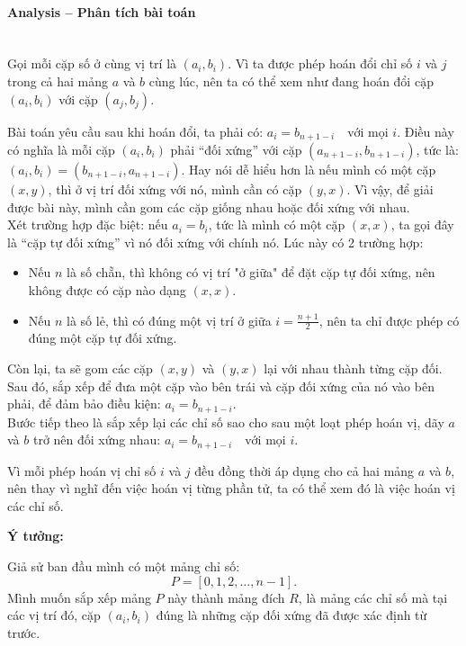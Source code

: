 \documentclass{article}
\begin{document}
\paragraph{Analysis -- Phân tích bài toán} \mbox{} \\

Gọi mỗi cặp số ở cùng vị trí là $(a_i, b_i)$. Vì ta được phép hoán đổi chỉ số $i$ và $j$ trong cả hai mảng $a$ và $b$ cùng lúc, nên ta có thể xem như đang hoán đổi cặp $(a_i, b_i)$ với cặp $(a_j, b_j)$.

Bài toán yêu cầu sau khi hoán đổi, ta phải có: $a_i = b_{n+1-i} \quad \text{với mọi } i.$
Điều này có nghĩa là mỗi cặp $(a_i, b_i)$ phải ``đối xứng'' với cặp $(a_{n+1-i}, b_{n+1-i})$, tức là: $(a_i, b_i) = (b_{n+1-i}, a_{n+1-i}).$
Hay nói dễ hiểu hơn là nếu mình có một cặp $(x, y)$, thì ở vị trí đối xứng với nó, mình cần có cặp $(y, x)$. Vì vậy, để giải được bài này, mình cần gom các cặp giống nhau hoặc đối xứng với nhau.\\

Xét trường hợp đặc biệt: nếu $a_i = b_i$, tức là mình có một cặp $(x, x)$, ta gọi đây là ``cặp tự đối xứng'' vì nó đối xứng với chính nó. Lúc này có 2 trường hợp:

\begin{itemize}
    \item Nếu $n$ là số chẵn, thì không có vị trí "ở giữa" để đặt cặp tự đối xứng, nên không được có cặp nào dạng $(x,x)$.
    \item Nếu $n$ là số lẻ, thì có đúng một vị trí ở giữa $i = \frac{n+1}{2}$, nên ta chỉ được phép có đúng một cặp tự đối xứng.
\end{itemize}

Còn lại, ta sẽ gom các cặp $(x, y)$ và $(y, x)$ lại với nhau thành từng cặp đối. Sau đó, sắp xếp để đưa một cặp vào bên trái và cặp đối xứng của nó vào bên phải, để đảm bảo điều kiện: $a_i = b_{n+1-i}.$\\

Bước tiếp theo là sắp xếp lại các chỉ số sao cho sau một loạt phép hoán vị, dãy $a$ và $b$ trở nên đối xứng nhau: $a_i = b_{n+1-i} \quad \text{với mọi } i.$

Vì mỗi phép hoán vị chỉ số $i$ và $j$ đều đồng thời áp dụng cho cả hai mảng $a$ và $b$, nên thay vì nghĩ đến việc hoán vị từng phần tử, ta có thể xem đó là việc hoán vị các chỉ số.

\textbf{Ý tưởng:}

Giả sử ban đầu mình có một mảng chỉ số:
\[
P = [0, 1, 2, \ldots, n - 1].
\]
Mình muốn sắp xếp mảng $P$ này thành mảng đích $R$, là mảng các chỉ số mà tại các vị trí đó, cặp $(a_i, b_i)$ đúng là những cặp đối xứng đã được xác định từ trước.
\end{document}
